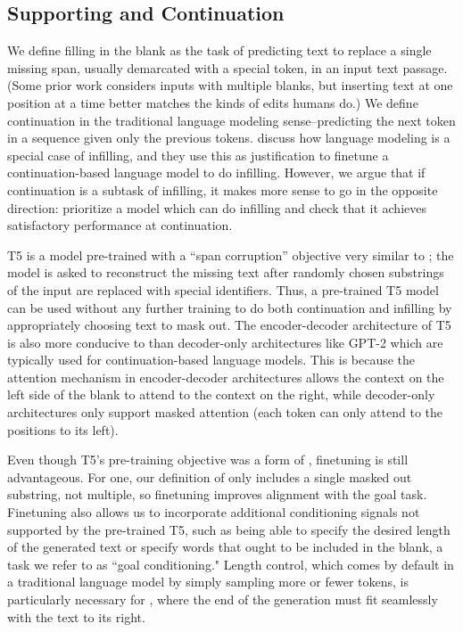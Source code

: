 \subsection{Supporting \FitB{} and Continuation}
\label{section:fitb_fite_methods}
We define filling in the blank as the task of predicting text to replace a single missing span, usually demarcated with a special token, in an input text passage. (Some prior work considers inputs with multiple blanks, but inserting text at one position at a time better matches the kinds of edits humans do.)
We define continuation in the traditional language modeling sense--predicting the next token in a sequence given only the previous tokens.
\citet{donahue2020enabling} discuss how language modeling is a special case of infilling, and they use this as justification to finetune a continuation-based language model to do infilling.
However, we argue that if continuation is a subtask of infilling, it makes more sense to go in the opposite direction: prioritize a model which can do infilling and check that it achieves satisfactory performance at continuation.

T5 is a model pre-trained with a ``span corruption'' objective very similar to \FitB; the model is asked to reconstruct the missing text after randomly chosen substrings of the input are replaced with special identifiers.
Thus, a pre-trained T5 model can be used without any further training to do both continuation and infilling by appropriately choosing text to mask out.
The encoder-decoder architecture of T5 is also more conducive to \FitB{} than decoder-only architectures like GPT-2 \citep{radford2019language} which are typically used for continuation-based language models.
This is because the attention mechanism in encoder-decoder architectures allows the context on the left side of the blank to attend to the context on the right, while decoder-only architectures only support masked attention (each token can only attend to the positions to its left).

Even though T5's pre-training objective was a form of \FitB, finetuning is still advantageous.
For one, our definition of \FitB{} only includes a single masked out substring, not multiple, so finetuning improves alignment with the goal task.
Finetuning also allows us to incorporate additional conditioning signals not supported by the pre-trained T5, such as being able to specify the desired length of the generated text or specify words that ought to be included in the blank, a task we refer to as ``goal conditioning."
Length control, which comes by default in a traditional language model
by simply sampling more or fewer
tokens, is particularly necessary for \FitB, where the end of the generation must fit seamlessly with the text to its right.

